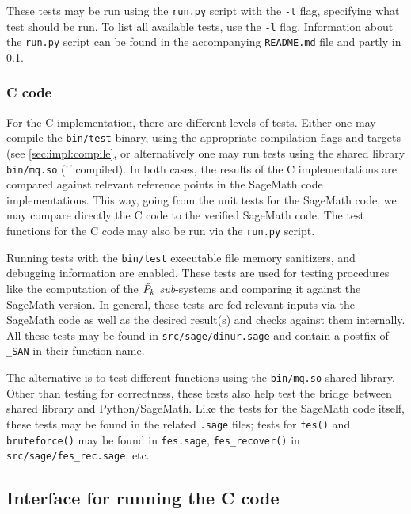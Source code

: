 These tests may be run using the \texttt{run.py} script with the \texttt{-t} flag, specifying what test should be run. To list all available tests, use the \texttt{-l} flag. Information about the \texttt{run.py} script can be found in the accompanying \texttt{README.md} file and partly in \cref{sec:impl:interface}.

\subsubsection{C code}

For the C implementation, there are different levels of tests. Either one may compile the \texttt{bin/test} binary, using the appropriate compilation flags and targets (see \cref{sec:impl:compile}, or alternatively one may run tests using the shared library \texttt{bin/mq.so} (if compiled). In both cases, the results of the C implementations are compared against relevant reference points in the SageMath code implementations. This way, going from the unit tests for the SageMath code, we may compare directly the C code to the verified SageMath code. The test functions for the C code may also be run via the \texttt{run.py} script.

Running tests with the \texttt{bin/test} executable file memory sanitizers, and debugging information are enabled. These tests are used for testing procedures like the computation of the $\Tilde{P}_k$ \textit{sub}-systems and comparing it against the SageMath version. In general, these tests are fed relevant inputs via the SageMath code as well as the desired result(s) and checks against them internally. All these tests may be found in \texttt{src/sage/dinur.sage} and contain a postfix of \texttt{\_SAN} in their function name.

The alternative is to test different functions using the \texttt{bin/mq.so} shared library. Other than testing for correctness, these tests also help test the bridge between shared library and Python/SageMath. Like the tests for the SageMath code itself, these tests may be found in the related \texttt{.sage} files; tests for \texttt{fes()} and \texttt{bruteforce()} may be found in \texttt{fes.sage}, \texttt{fes\_recover()} in \texttt{src/sage/fes\_rec.sage}, etc.

\subsection{Interface for running the C code} \label{sec:impl:interface}


